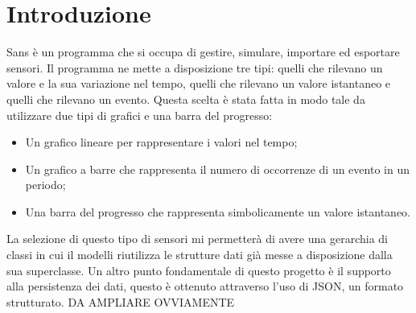 \documentclass[a4paper]{article}
\begin{document}
\section{Introduzione}
Sans è un programma che si occupa di gestire, simulare, importare ed esportare sensori.
Il programma ne mette a disposizione tre tipi: quelli che rilevano un valore e la sua variazione nel tempo, quelli che rilevano un valore istantaneo e quelli che rilevano un evento.
Questa scelta è stata fatta in modo tale da utilizzare due tipi di grafici e una barra del progresso: 
\begin{itemize}
    \item Un grafico lineare per rappresentare i valori nel tempo;
    \item Un grafico a barre che rappresenta il numero di occorrenze di un evento in un periodo;
    \item Una barra del progresso che rappresenta simbolicamente un valore istantaneo.
\end{itemize}
La selezione di questo tipo di sensori mi permetterà di avere una gerarchia di classi in cui il modelli riutilizza le strutture dati già messe a disposizione dalla sua superclasse.
Un altro punto fondamentale di questo progetto è il supporto alla persistenza dei dati, questo è ottenuto attraverso l'uso di JSON, un formato strutturato. DA AMPLIARE OVVIAMENTE
\end{document}
